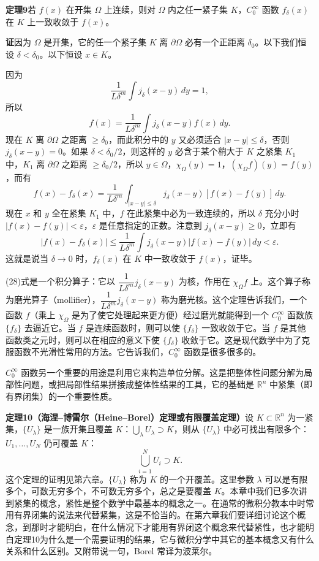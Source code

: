 \noindent\textbf{定理9}\quad 若 $f(x)$ 在开集 $\Omega$ 上连续，则对 $\Omega$ 内之任一紧子集 $K$，$C_0^\infty$ 函数 $f_\delta(x)$ 在 $K$ 上一致收敛于 $f(x)$。

\noindent\textbf{证}\quad 因为 $\Omega$ 是开集，它的任一个紧子集 $K$ 离 $\partial\Omega$ 必有一个正距离 $\delta_0$。以下我们恒设 $\delta<\delta_0$。以下恒设 $x\in K$。

因为
\[
 \frac1{L\delta^m}\int j_\delta(x-y)\,dy=1,
\]
所以
\[
 f(x)=\frac1{L\delta^m}\int j_\delta(x-y)f(x)\,dy.
\]
现在 $K$ 离 $\partial\Omega$ 之距离 $\ge\delta_0$，而此积分中的 $y$ 又必须适合 $|x-y|\le\delta$，否则 $j_\delta(x-y)=0$。如果 $\delta<\delta_0/2$，则这样的 $y$ 必含于某个稍大于 $K$ 之紧集 $K_1$ 中，$K_1$ 离 $\partial\Omega$ 之距离 $\ge\delta_0/2$，所以 $y\in\Omega$，$\chi_\Omega(y)=1$，$(\chi_\Omega f)(y)=f(y)$，而有
\[
 f(x)-f_\delta(x)
 =\frac1{L\delta^m}\int_{|x-y|\le\delta}j_\delta(x-y)[f(x)-f(y)]\,dy.
\]
现在 $x$ 和 $y$ 全在紧集 $K_1$ 中，$f$ 在此紧集中必为一致连续的，所以 $\delta$ 充分小时 $|f(x)-f(y)|<\varepsilon$，$\varepsilon$ 是任意指定的正数。注意到 $j_\delta(x-y)\ge0$，立即有
\[
 |f(x)-f_\delta(x)|
 \le\frac1{L\delta^m}\int j_\delta(x-y)|f(x)-f(y)|\,dy<\varepsilon.
\]
这就是说当 $\delta\to0$ 时，$f_\delta(x)$ 在 $K$ 中一致收敛于 $f(x)$，证毕。

(28)式是一个积分算子：它以 $\dfrac1{L\delta^m}j_\delta(x-y)$ 为核，作用在 $\chi_\Omega f$ 上。这个算子称为磨光算子（mollifier），$\dfrac1{L\delta^m}j_\delta(x-y)$ 称为磨光核。这个定理告诉我们，一个函数 $f$（乘上 $\chi_\Omega$ 是为了使它处理起来更方便）经过磨光就能得到一个 $C_0^\infty$ 函数族 $\{f_\delta\}$ 去逼近它。当 $f$ 是连续函数时，则可以使 $\{f_\delta\}$ 一致收敛于它。当 $f$ 是其他函数类之元时，则可以在相应的意义下使 $\{f_\delta\}$ 收敛于它。这是现代数学中为了克服函数不光滑性常用的方法。它告诉我们，$C_0^\infty$ 函数是很多很多的。

$C_0^\infty$ 函数另一个重要的用途是利用它来构造单位分解。这是把整体性问题分解为局部性问题，或把局部性结果拼接成整体性结果的工具，它的基础是 $\mathbb R^n$ 中紧集（即有界闭集）的一个重要性质。

\noindent\textbf{定理10（海涅--博雷尔（Heine--Borel）定理或有限覆盖定理）}\quad 设 $K\subset\mathbb R^n$ 为一紧集，$\{U_\lambda\}$ 是一族开集且覆盖 $K$：$\bigcup_\lambda U_\lambda\supset K$，则从 $\{U_\lambda\}$ 中必可找出有限多个：$U_1,\ldots,U_N$ 仍可覆盖 $K$：
\[
 \bigcup_{i=1}^N U_i\supset K.
\]
这个定理的证明见第六章。$\{U_\lambda\}$ 称为 $K$ 的一个开覆盖。这里参数 $\lambda$ 可以是有限多个，可数无穷多个，不可数无穷多个，总之是要覆盖 $K$。本章中我们已多次讲到紧集的概念，紧性是整个数学中最基本的概念之一。在通常的微积分教本中时常用有界闭集的说法来代替紧集，这是不恰当的。在第六章我们要详细讨论这个概念，到那时才能明白，在什么情况下才能用有界闭这个概念来代替紧性，也才能明白定理10为什么是一个需要证明的结果，它与微积分学中其它的基本概念又有什么关系和什么区别。又附带说一句，Borel 常译为波莱尔。

